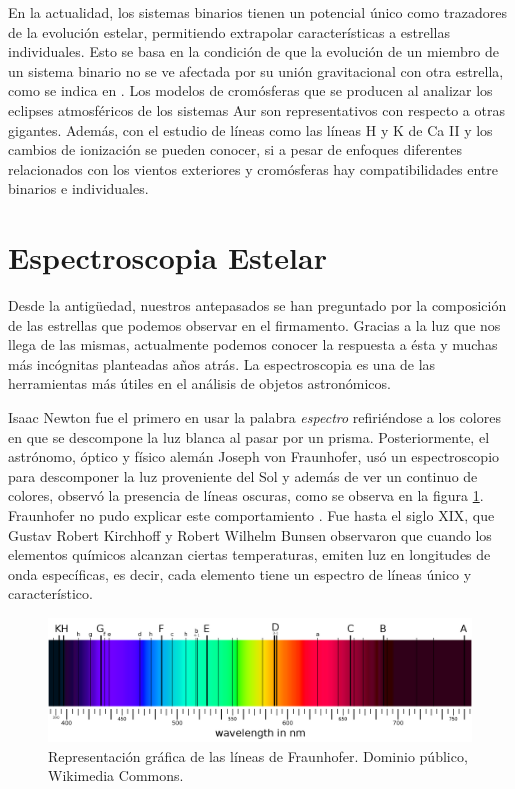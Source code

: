 \documentclass[12pt,oneside,openany,letter]{book}
\begin{document}
\noindent En la actualidad, los sistemas binarios tienen un potencial único como trazadores de la evolución estelar, permitiendo extrapolar características a estrellas individuales. Esto se basa en la condición de que la evolución de un miembro de un sistema binario no se ve afectada por su unión gravitacional con otra estrella, como se indica en \citep{schroder1997critical}. Los modelos de cromósferas que se producen al analizar los eclipses atmosféricos de los sistemas Aur son representativos con respecto a otras gigantes. Además, con el estudio de líneas como las líneas H y K de Ca II y los cambios de ionización se pueden conocer, si a pesar de enfoques diferentes relacionados con los vientos exteriores y cromósferas hay compatibilidades entre binarios e individuales.




\section{Espectroscopia Estelar}\label{espectroscopia}

\noindent Desde la antigüedad, nuestros antepasados se han preguntado por la composición de las estrellas que podemos observar en el firmamento. Gracias a la luz que nos llega de las mismas, actualmente podemos conocer la respuesta a ésta y muchas más incógnitas planteadas años atrás. La espectroscopia es una de las herramientas más útiles en el análisis de objetos astronómicos.
\vspace{2mm}

\noindent Isaac Newton fue el primero en usar la palabra \textit{espectro} refiriéndose a los colores en que se descompone la luz blanca al pasar por un prisma. Posteriormente, el astrónomo, óptico y físico alemán Joseph von Fraunhofer, usó un espectroscopio para descomponer la luz proveniente del Sol y además de ver un continuo de colores, observó la presencia de líneas oscuras, como se observa en la figura \ref{espectro_frauhofer}. Fraunhofer no pudo explicar este comportamiento \citep{von1823denkschriften}. Fue hasta el siglo XIX, que Gustav Robert Kirchhoff y Robert Wilhelm Bunsen observaron que cuando los elementos químicos alcanzan ciertas temperaturas, emiten luz en longitudes de onda específicas, es decir, cada elemento tiene un espectro de líneas único y característico.

\begin{figure}[h]
    \centering
    \includegraphics[width=1\linewidth]{Images/espectro_fraunhofer.png}
    \caption{Representación gráfica de las líneas de Fraunhofer. Dominio público, Wikimedia Commons.}
    \label{espectro_frauhofer}
\end{figure}
\end{document}
